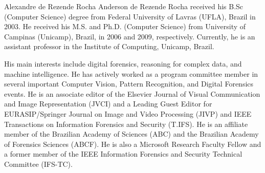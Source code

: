 \documentclass[journal]{IEEEtran}
\begin{document}
\begin{IEEEbiography}{Alexandre de Rezende Rocha}
Anderson de Rezende Rocha received his B.Sc (Computer Science) degree from Federal University of Lavras (UFLA), Brazil in 2003. He received his M.S. and Ph.D. (Computer Science) from University of Campinas (Unicamp), Brazil, in 2006 and 2009, respectively. 
Currently, he is an assistant professor in the Institute of Computing, Unicamp, Brazil. 

His main interests include digital forensics, reasoning for complex data, and machine  intelligence. 
He has actively worked as a program committee member in several important Computer Vision, Pattern Recognition, and Digital Forensics events. 
He is an associate editor of the Elsevier Journal of Visual Communication and Image Representation (JVCI) and a Leading Guest Editor for EURASIP/Springer Journal on Image and Video Processing 
(JIVP) and IEEE Transactions on Information Forensics and Security (T.IFS). 
He is an affiliate member of the Brazilian Academy of Sciences (ABC) and the Brazilian Academy of Forensics Sciences (ABCF). 
He is also a Microsoft Research Faculty Fellow and a former member of the IEEE Information Forensics and Security Technical Committee (IFS-TC).
\end{IEEEbiography}
\end{document}
